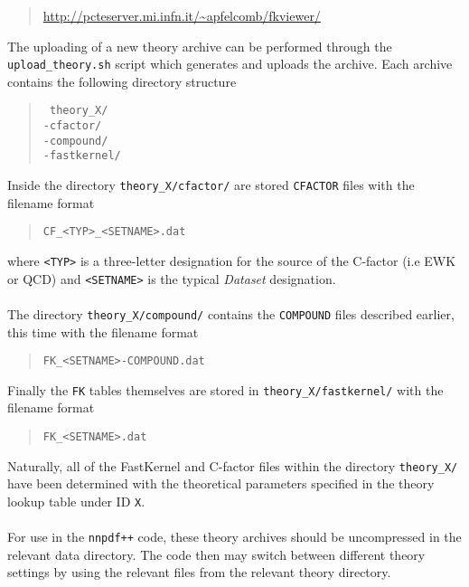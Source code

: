\documentclass[11pt]{article}
\begin{document}
\begin{quotation}
    \url{http://pcteserver.mi.infn.it/~apfelcomb/fkviewer/}
\end{quotation}
The uploading of a new theory archive can be performed through the {\tt upload\_theory.sh} script which generates and uploads the archive.
Each archive contains the following directory structure
\begin{quotation}\noindent
{\tt
theory\_X/ \\
\-\hspace{1cm}-cfactor/\\
\-\hspace{1cm}-compound/\\
\-\hspace{1cm}-fastkernel/\\
}
\end{quotation}
Inside the directory {\tt theory\_X/cfactor/} are stored {\tt CFACTOR} files with the filename format
\begin{quotation}\noindent
{\tt CF\_<TYP>\_<SETNAME>.dat }
\end{quotation}
where {\tt<TYP>} is a three-letter designation for the source of the C-factor (i.e EWK or QCD) and {\tt<SETNAME>} is the typical {\it Dataset} designation. \\\\
The directory {\tt theory\_X/compound/} contains the {\tt COMPOUND} files described earlier, this time with the filename format
\begin{quotation}\noindent
{\tt FK\_<SETNAME>-COMPOUND.dat }
\end{quotation}
Finally the {\tt FK} tables themselves are stored in {\tt theory\_X/fastkernel/} with the filename format
\begin{quotation}\noindent
{\tt FK\_<SETNAME>.dat }
\end{quotation}
Naturally, all of the FastKernel and C-factor files within the directory {\tt theory\_X/} have been determined with the theoretical parameters specified in the theory lookup table under ID {\tt X}.
\\\\
For use in the {\tt nnpdf++} code, these theory archives should be uncompressed in the relevant
data directory. The code then may switch between different theory settings by using the relevant files from the relevant theory directory.

\clearpage
\appendix
\end{document}
